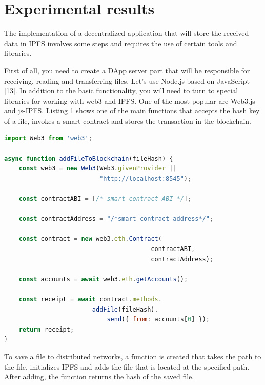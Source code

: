 \documentclass[10pt,conference,a4paper]{IEEEtran_EDM}
\begin{document}
\section{Experimental results}
The implementation of a decentralized application that will store the received data in IPFS involves some steps and requires the use of certain tools and libraries. 

First of all, you need to create a DApp server part that will be responsible for receiving, reading and transferring files. Let's use Node.js based on JavaScript [13]. In addition to the basic functionality, you will need to turn to special libraries for working with web3 and IPFS. One of the most popular are Web3.js and js-IPFS. Listing 1 shows one of the main functions that accepts the hash key of a file, invokes a smart contract and stores the transaction in the blockchain.


\begin{lstlisting}[language=JavaScript, caption=JavaScript code implementing saving to the blockchain]
import Web3 from 'web3';

async function addFileToBlockchain(fileHash) {
    const web3 = new Web3(Web3.givenProvider ||
                          "http://localhost:8545");

    const contractABI = [/* smart contract ABI */];

    const contractAddress = "/*smart contract address*/";

    const contract = new web3.eth.Contract(
                                        contractABI,
                                        contractAddress);

    const accounts = await web3.eth.getAccounts();

    const receipt = await contract.methods.
                        addFile(fileHash).
                            send({ from: accounts[0] });
    return receipt;
}
\end{lstlisting}

To save a file to distributed networks, a function is created that takes the path to the file, initializes IPFS and adds the file that is located at the specified path. After adding, the function returns the hash of the saved file.
\end{document}

